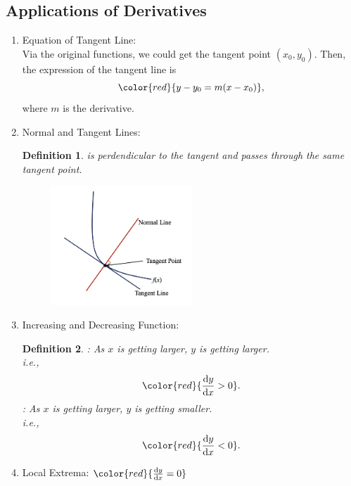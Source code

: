 \documentclass[12pt, a4paper]{article}
\newtheorem{definition}{Definition}[subsection]
\begin{document}
\subsection{Applications of Derivatives}
\begin{enumerate}
    \item Equation of Tangent Line: \\
    Via the original functions, we could get the tangent point $(x_0, y_0)$. Then, the expression of the tangent line is 
    $${\color{red}{y-y_0=m(x-x_0)}},$$ 
    where $m$ is the derivative. 
    \item Normal and Tangent Lines: 
    \begin{definition}
        \textbf{\color{red}{Normal}} is perdendicular to the tangent and passes through the same tangent point. 
        \begin{figure}[H]
            \centering 
            \includegraphics[width=0.5\textwidth]{Fig.5.4.jpg} 
        \end{figure}
    \end{definition}
    \item Increasing and Decreasing Function: 
    \begin{definition}
        \textbf{\color{red}{Increasing Function}}: As $x$ is getting larger, $y$ is getting larger.\\
        i.e., $${\color{red}{\frac{\mathrm{d}y}{\mathrm{d}x}>0}}.$$
        \textbf{\color{red}{Decreasing Function}}: As $x$ is getting larger, $y$ is getting smaller.\\
        i.e., $${\color{red}{\frac{\mathrm{d}y}{\mathrm{d}x}<0}}.$$
    \end{definition}
    \item Local Extrema: $\color{red}{\frac{\mathrm{d}y}{\mathrm{d}x}=0}$ {\color{red}{Stationary point}}\\
    {\color{green}{Global extrema is the maximum and the minimum points of the entire function.}}\\

\end{enumerate}
\end{document}
